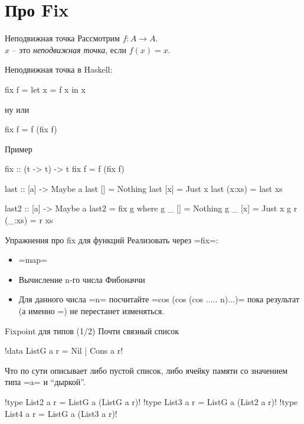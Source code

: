 \documentclass[
  xcolor={svgnames},
  hyperref={colorlinks,citecolor=DeepPink4,linkcolor=DarkRed,urlcolor=DarkBlue}]{beamer}
\begin{document}
\section{Про Fix}
\begin{frame}[fragile]{Неподвижная точка}
Рассмотрим $f: A \rightarrow A$. \\
$x$ -- это \textit{неподвижная точка}, если $f(x) = x$.

\vspace{1cm}
Неподвижная точка в Haskell:
\begin{verbnobox}[\monacoB]
 fix f = let {x = f x} in x
\end{verbnobox}
ну или
\begin{verbnobox}[\monacoB]
 fix f = f (fix f)
\end{verbnobox}
\end{frame}

\begin{frame}[fragile]{Пример}
\begin{verbnobox}[\monacoB]
fix :: (t -> t) -> t
fix f = f (fix f)
\end{verbnobox}
 
\begin{verbnobox}[\monacoB]
last :: [a] -> Maybe a
last [] = Nothing
last [x] = Just x
last (x:xs) = last xs
\end{verbnobox}
\pause
\begin{verbnobox}[\monacoB]
last2 :: [a] -> Maybe a
last2 = fix g 
  where 
    g _ []     = Nothing
    g _ [x]    = Just x
    g r (_:xs) = r xs
\end{verbnobox}
\end{frame}

\begin{frame}[fragile]{Упражнения про fix для функций}
 Реализовать через \hsinline=fix=:
 \begin{itemize}
  \item \hsinline=map=
  \item Вычисление n-го числа Фибоначчи
  \item Для данного числа \hsinline=n= посчитайте \hsinline=cos (cos (cos ..... n)...)= пока результат (а именно =) не перестанет изменяться. 
 \end{itemize}

\end{frame}

\begin{frame}[fragile]{Fixpoint для типов (1/2) }
Почти связный список
\begin{center}
\hsinline!data ListG a r = Nil | Cons a r!
\end{center}
Что по сути описывает либо пустой список, либо ячейку памяти со значением типа \hsinline=a= и ``дыркой''.

\begin{center}
\hsinline!type List2 a r = ListG a (ListG a r)!
\hsinline!type List3 a r = ListG a (List2 a r)!
\hsinline!type List4 a r = ListG a (List3 a r)!
\end{center}

\end{frame}
\end{document}
